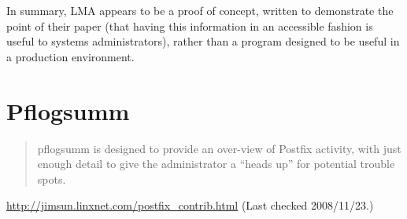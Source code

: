 In summary, \gls{LMA} appears to be a proof of concept, written to
demonstrate the point of their paper (that having this information in an
accessible fashion is useful to systems administrators), rather than a
program designed to be useful in a production environment.

%

\section{Pflogsumm}

\begin{quotation}

    pflogsumm is designed to provide an over-view of Postfix activity, with
    just enough detail to give the administrator a ``heads up'' for
    potential trouble spots.

\end{quotation}

\noindent{}\url{http://jimsun.linxnet.com/postfix_contrib.html} \newline{}
(Last checked 2008/11/23.)

